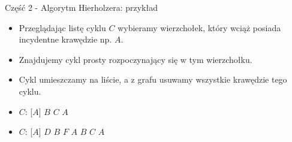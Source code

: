 \documentclass[polish,envcountsect,10pt]{beamer}
\begin{document}
\begin{frame}{Część 2 - Algorytm Hierholzera: przykład}
    \begin{itemize}
        \item Przeglądając listę cyklu $C$ wybieramy wierzchołek, który wciąż posiada incydentne krawędzie np. $A$.
        \item Znajdujemy cykl prosty rozpoczynający się w tym wierzchołku.
        \item Cykl umieszczamy na liście, a z grafu usuwamy wszystkie krawędzie tego cyklu.
        \item $C$: [$A$] $B$ $C$ $A$
        \item $C$: [$A$] $D$ $B$ $F$ $A$ $B$ $C$ $A$
    \end{itemize}
    \begin{center}
    \end{center}
\end{frame}
\end{document}
